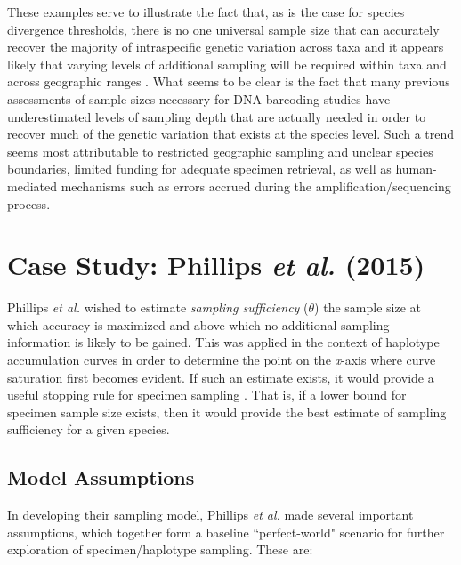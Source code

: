 \vspace{5mm}

These examples serve to illustrate the fact that, as is the case for species divergence thresholds, there is no one universal sample size that can accurately recover the majority of intraspecific genetic variation across taxa and it appears likely that varying levels of additional sampling will be required within taxa and across geographic ranges \cite{lou2012effect}. What seems to be clear is the fact that many previous assessments of sample sizes necessary for DNA barcoding studies have underestimated levels of sampling depth that are actually needed in order to recover much of the genetic variation that exists at the species level. Such a trend seems most attributable to restricted geographic sampling and unclear species boundaries, limited funding for adequate specimen retrieval, as well as human-mediated mechanisms such as errors accrued during the amplification/sequencing process. 

\vspace{5mm}

\section{Case Study: Phillips \textit{et al.} (2015)}

Phillips \textit{et al.} \cite{phillips2015exploration} wished to estimate \textit{sampling sufficiency} ($\theta$) \textemdash \hspace{1mm} the sample size at which accuracy is maximized and above which no additional sampling information is likely to be gained. This was applied in the context of haplotype accumulation curves in order to determine the point on the \textit{x}-axis where curve saturation first becomes evident. If such an estimate exists, it would provide a useful stopping rule for specimen sampling \cite{phillips2015exploration}. That is, if a lower bound for specimen sample size exists, then it would provide the best estimate of sampling sufficiency for a given species.

\vspace{5mm}

\subsection{Model Assumptions}

In developing their sampling model, Phillips \textit{et al.} \cite{phillips2015exploration} made several important \\ assumptions, which together form a baseline ``perfect-world" scenario for further \\ exploration of specimen/haplotype sampling. These are:

